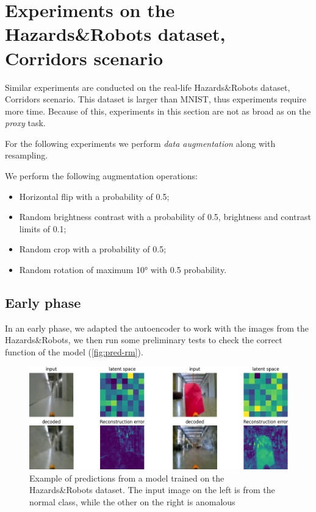     \section{Experiments on the Hazards\&Robots dataset, Corridors scenario}
        Similar experiments are conducted on the real-life Hazards\&Robots dataset, Corridors scenario. This dataset is larger than MNIST, thus experiments require more time. Because of this, experiments in this section are not as broad as on the \emph{proxy} task.
        
        
        For the following experiments we perform \emph{data augmentation} along with resampling.
        
        We perform the following augmentation operations:
        \begin{itemize}
            \item Horizontal flip with a probability of 0.5;
            \item Random brightness contrast with a probability of 0.5, brightness and contrast limits of 0.1;
            \item Random crop with a probability of 0.5;
            \item Random rotation of maximum 10° with 0.5 probability.
        \end{itemize}
        \subsection{Early phase}
            In an early phase, we adapted the autoencoder to work with the images from the Hazards\&Robots, we then run some preliminary tests to check the correct function of the model (\autoref{fig:pred-rm}).
            
            \begin{figure}[H]
                \centering
                \centerline{\includegraphics[width=\textwidth]{img/prediction_RM.png}}
                \caption{Example of predictions from a model trained on the Hazards\&Robots dataset. The input image on the left is from the normal class, while the other on the right is anomalous}
                \label{fig:pred-rm}
            \end{figure}
            
